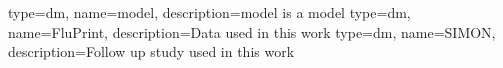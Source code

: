 {
    type=dm,
    name=model,
    description={model is a model}
}
{
    type=dm,
    name=FluPrint,
    description={Data used in this work}
}
{
    type=dm,
    name=SIMON,
    description={Follow up study used in this work}
}

